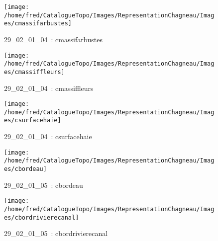 \documentclass[12pt,titlepage]{book}
\begin{document}
\begin{figure}[h!]
\begin{minipage}[t]{3cm}
\begin{center}
    \end{center}
  \end{minipage}
  \begin{minipage}[t]{3cm}
    \begin{center}
      \texttt{[image: /home/fred/CatalogueTopo/Images/RepresentationChagneau/Images/cmassifarbustes]}
      \caption[~29\_02\_01\_04]{\small{29\_02\_01\_04~:} \tiny{cmassifarbustes}}\label{cmassifarbustes}
    \end{center}
  \end{minipage}
  \begin{minipage}[t]{3cm}
    \begin{center}
      \texttt{[image: /home/fred/CatalogueTopo/Images/RepresentationChagneau/Images/cmassiffleurs]}
      \caption[~29\_02\_01\_04]{\small{29\_02\_01\_04~:} \tiny{cmassiffleurs}}\label{cmassiffleurs}
    \end{center}
  \end{minipage}
  \begin{minipage}[t]{3cm}
    \begin{center}
      \texttt{[image: /home/fred/CatalogueTopo/Images/RepresentationChagneau/Images/csurfacehaie]}
      \caption[~29\_02\_01\_04]{\small{29\_02\_01\_04~:} \tiny{csurfacehaie}}\label{csurfacehaie}
    \end{center}
  \end{minipage}
  \begin{minipage}[t]{3cm}
    \begin{center}
      \texttt{[image: /home/fred/CatalogueTopo/Images/RepresentationChagneau/Images/cbordeau]}
      \caption[~29\_02\_01\_05]{\small{29\_02\_01\_05~:} \tiny{cbordeau}}\label{cbordeau}
    \end{center}
  \end{minipage}
  \begin{minipage}[t]{3cm}
    \begin{center}
      \texttt{[image: /home/fred/CatalogueTopo/Images/RepresentationChagneau/Images/cbordrivierecanal]}
      \caption[~29\_02\_01\_05]{\small{29\_02\_01\_05~:} \tiny{cbordrivierecanal}}\label{cbordrivierecanal}
    \end{center}
  \end{minipage}
  \begin{minipage}[t]{3cm}

\end{minipage}
\end{figure}
\end{document}
